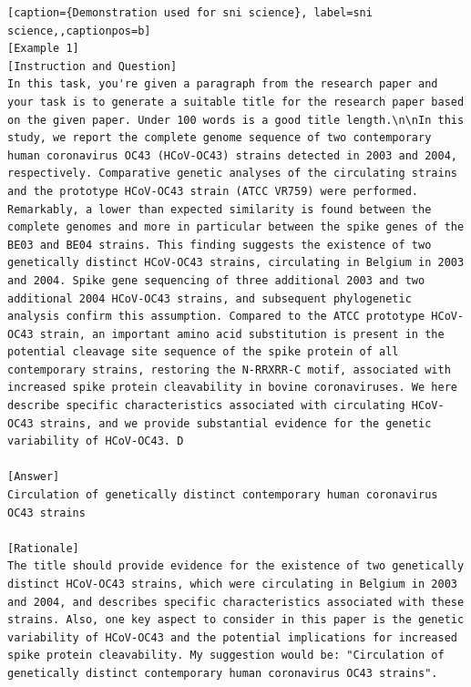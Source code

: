 \begin{lstlisting}[caption={Demonstration used for sni science}, label=sni science,,captionpos=b]
[Example 1]
[Instruction and Question]
In this task, you're given a paragraph from the research paper and your task is to generate a suitable title for the research paper based on the given paper. Under 100 words is a good title length.\n\nIn this study, we report the complete genome sequence of two contemporary human coronavirus OC43 (HCoV-OC43) strains detected in 2003 and 2004, respectively. Comparative genetic analyses of the circulating strains and the prototype HCoV-OC43 strain (ATCC VR759) were performed. Remarkably, a lower than expected similarity is found between the complete genomes and more in particular between the spike genes of the BE03 and BE04 strains. This finding suggests the existence of two genetically distinct HCoV-OC43 strains, circulating in Belgium in 2003 and 2004. Spike gene sequencing of three additional 2003 and two additional 2004 HCoV-OC43 strains, and subsequent phylogenetic analysis confirm this assumption. Compared to the ATCC prototype HCoV-OC43 strain, an important amino acid substitution is present in the potential cleavage site sequence of the spike protein of all contemporary strains, restoring the N-RRXRR-C motif, associated with increased spike protein cleavability in bovine coronaviruses. We here describe specific characteristics associated with circulating HCoV-OC43 strains, and we provide substantial evidence for the genetic variability of HCoV-OC43. D

[Answer]
Circulation of genetically distinct contemporary human coronavirus OC43 strains

[Rationale]
The title should provide evidence for the existence of two genetically distinct HCoV-OC43 strains, which were circulating in Belgium in 2003 and 2004, and describes specific characteristics associated with these strains. Also, one key aspect to consider in this paper is the genetic variability of HCoV-OC43 and the potential implications for increased spike protein cleavability. My suggestion would be: "Circulation of genetically distinct contemporary human coronavirus OC43 strains".




\end{lstlisting}
